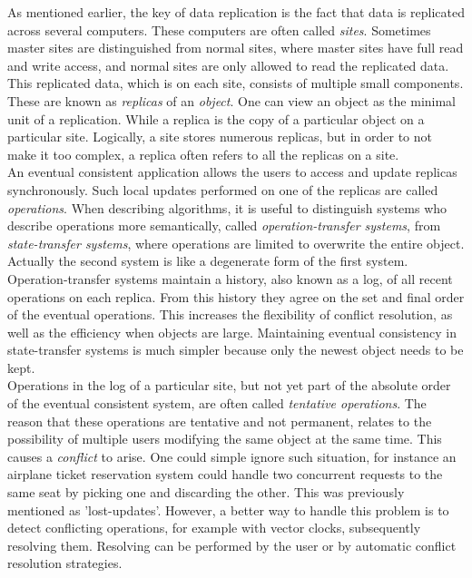 \documentclass[a4paper,12pt]{report}
\begin{document}
As mentioned earlier, the key of data replication is the fact that data is replicated across several computers. These computers are often called \textit{sites}. Sometimes master sites are distinguished from normal sites, where master sites have full read and write access, and normal sites are only allowed to read the replicated data. This replicated data, which is on each site, consists of multiple small components. These are known as \textit{replicas} of an \textit{object}. One can view an object as the minimal unit of a replication. While a replica is the copy of a particular object on a particular site. Logically, a site stores numerous replicas, but in order to not make it too complex, a replica often refers to all the replicas on a site. \\
\indent An eventual consistent application allows the users to access and update replicas synchronously. Such local updates performed on one of the replicas are called \textit{operations}. When describing algorithms, it is useful to distinguish systems who describe operations more semantically, called \textit{operation-transfer systems}, from \textit{state-transfer systems}, where operations are limited to overwrite the entire object. Actually the second system is like a degenerate form of the first system. Operation-transfer systems maintain a history, also known as a log, of all recent operations on each replica. From this history they agree on the set and final order of the eventual operations. This increases the flexibility of conflict resolution, as well as the efficiency when objects are large. Maintaining eventual consistency in state-transfer systems is much simpler because only the newest object needs to be kept. \\
\indent Operations in the log of a particular site, but not yet part of the absolute order of the eventual consistent system, are often called \textit{tentative operations}. The reason that these operations are tentative and not permanent, relates to the possibility of multiple users modifying the same object at the same time. This causes a \textit{conflict} to arise. One could simple ignore such situation, for instance an airplane ticket reservation system could handle two concurrent requests to the same seat by picking one and discarding the other. This was previously mentioned as 'lost-updates'. However, a better way to handle this problem is to detect conflicting operations, for example with vector clocks, subsequently resolving them. Resolving can be performed by the user or by automatic conflict resolution strategies. \\
\end{document}
